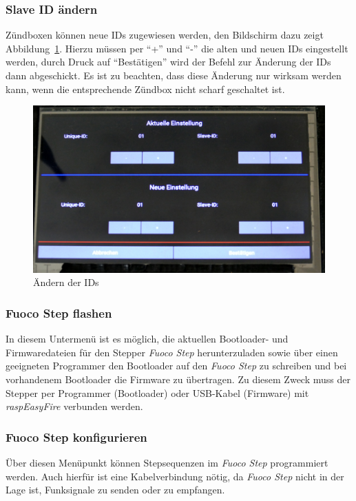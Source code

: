 \documentclass[paper=a4, parskip, numbers=noenddot, toc=listof, headsepline]{scrbook}
\begin{document}
				\subsubsection{Slave ID ändern}
					Zündboxen können neue IDs zugewiesen werden, den Bildschirm dazu zeigt Abbildung~\ref{fig:REFids}. Hierzu müssen per \enquote{+} und \enquote{-} die alten und neuen IDs eingestellt werden, durch Druck auf \enquote{Bestätigen} wird der Befehl zur Änderung der IDs dann abgeschickt. Es ist zu beachten, dass diese Änderung nur wirksam werden kann, wenn die entsprechende Zündbox nicht scharf geschaltet ist.

					\begin{figure}
						\centering\includegraphics[width=150mm]{Bilder/REFids}
						\caption{Ändern der IDs}
						\label{fig:REFids}
					\end{figure}
				
				\subsubsection{Fuoco Step flashen}
					In diesem Untermenü ist es möglich, die aktuellen Bootloader- und Firmwaredateien für den Stepper \emph{Fuoco Step} herunterzuladen sowie über einen geeigneten Programmer den Bootloader auf den \emph{Fuoco Step} zu schreiben und bei vorhandenem Bootloader die Firmware zu übertragen. Zu diesem Zweck muss der Stepper per Programmer (Bootloader) oder USB-Kabel (Firmware) mit \emph{raspEasyFire} verbunden werden.

				\subsubsection{Fuoco Step konfigurieren}
					Über diesen Menüpunkt können Stepsequenzen im \emph{Fuoco Step} programmiert werden. Auch hierfür ist eine Kabelverbindung nötig, da \emph{Fuoco Step} nicht in der Lage ist, Funksignale zu senden oder zu empfangen.
					
\end{document}
